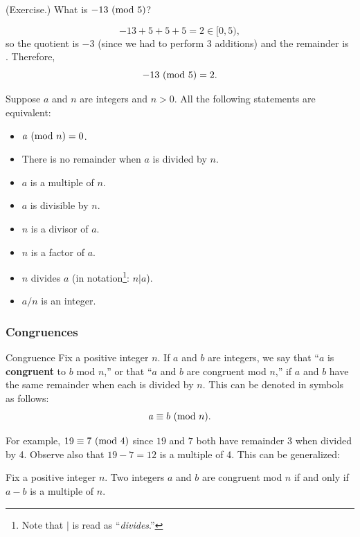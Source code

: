 \documentclass[letterpaper]{article}
\begin{document}
\begin{mdframed}
    (Exercise.) What is $-13 \ (\mathrm{mod}\ 5)$?
    \begin{mdframed}
        \[-13 + 5 + 5 + 5 = 2 \in [0, 5),\]
        so the quotient is $-3$ (since we had to perform 3 additions) and the remainder is . Therefore, 
        \[-13 \ (\mathrm{mod}\ 5) = 2.\]
    \end{mdframed}
\end{mdframed}

\begin{proposition}
    Suppose $a$ and $n$ are integers and $n > 0$. All the following statements are equivalent:
    \begin{itemize}
        \item $a \ (\mathrm{mod}\ n) = 0$.
        \item There is no remainder when $a$ is divided by $n$. 
        \item $a$ is a multiple of $n$. 
        \item $a$ is divisible by $n$. 
        \item $n$ is a divisor of $a$. 
        \item $n$ is a factor of $a$. 
        \item $n$ divides $a$ (in notation\footnote{Note that $\vert$ is read as ``\emph{divides}.''}: $n \vert a$).
        \item $a / n$ is an integer.
    \end{itemize}
\end{proposition}

\subsubsection{Congruences}
\begin{definition}{Congruence}{}
    Fix a positive integer $n$. If $a$ and $b$ are integers, we say that ``$a$ is \textbf{congruent} to $b$ mod $n$,'' or that ``$a$ and $b$ are congruent mod $n$,'' if $a$ and $b$ have the same remainder when each is divided by $n$. This can be denoted in symbols as follows: 
    \[a \equiv b \ (\mathrm{mod}\ n).\] 
\end{definition}
For example, $19 \equiv 7 \ (\mathrm{mod}\ 4)$ since $19$ and $7$ both have remainder 3 when divided by 4. Observe also that $19 - 7 = 12$ is a multiple of 4. This can be generalized: 

\begin{lemma}{}{}
    Fix a positive integer $n$. Two integers $a$ and $b$ are congruent mod $n$ if and only if $a - b$ is a multiple of $n$.
\end{lemma}
\end{document}
